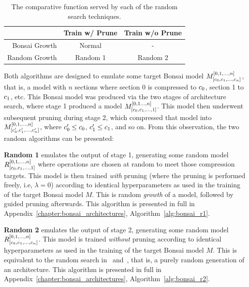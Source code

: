 \begin{table}[h]
\begin{center}
	\begin{tabular}{r|cc|}
					& Train w/ Prune & Train w/o Prune \\ \hline
	Bonsai Growth	& Normal 		& 	- \\
	Random Growth	& Random 1		& Random 2 \\
	\end{tabular}
\end{center}
\caption[The function of each random search technique]{The comparative function served by each of the random search techniques.}
\label{tab:search_stages}
\end{table}

Both algorithms are designed to emulate some target Bonsai model $M^{[0,1,\dots,n]}_{[c_0,c_1,\dots, c_n]}$,
that is, a model with $n$ sections where section 0 is compressed to $c_0$, section 1 to $c_1$, etc. This Bonsai
model was produced via the two stages of architecture search, where stage 1 produced a model $M^{[0,1\dots,n]}_{[c_0,c_1,\dots, 1]}$.
This model then underwent subsequent pruning during stage 2, which compressed that model into $M^{[0,1,\dots,n]}_{[c'_0,c'_1,\dots, c'_{n}]}$,
where $c'_0 \le c_0$, $c'_1 \le c_1$, and so on. From this observation, the two random algorithms can be presented:

\vspace{1em}
\textbf{Random 1} emulates the output of stage 1, generating some random model $R^{[0,1,\dots,n]}_{[c_0,c_1,\dots, 1]}$
where operations are chosen at random to meet those compression targets. This model is then trained \textit{with} pruning
(where the pruning is performed freely, i.e, $\lambda=0$) according to identical hyperparameters as used in the
training of the target Bonsai model $M$. This is random \textit{growth} of a model, followed by guided pruning afterwards.
This algorithm is presented in full in Appendix~\ref{chapter:bonsai_architectures}, Algorithm~\ref{alg:bonsai_r1}.
\vspace{1em}

\textbf{Random 2} emulates the output of stage 2, generating some random model $R^{[0,1,\dots,n]}_{[c_0,c_1,\dots,c_n]}$.
This model is trained \textit{without} pruning according to identical hyperparameters as used in the training of the target Bonsai model $M$.
This is equivalent to the random search in~\cite{yu2019} and~\cite{li2019}, that is, a purely random generation
of an architecture. This algorithm is presented in full in Appendix~\ref{chapter:bonsai_architectures}, Algorithm~\ref{alg:bonsai_r2}.
\vspace{1em}

